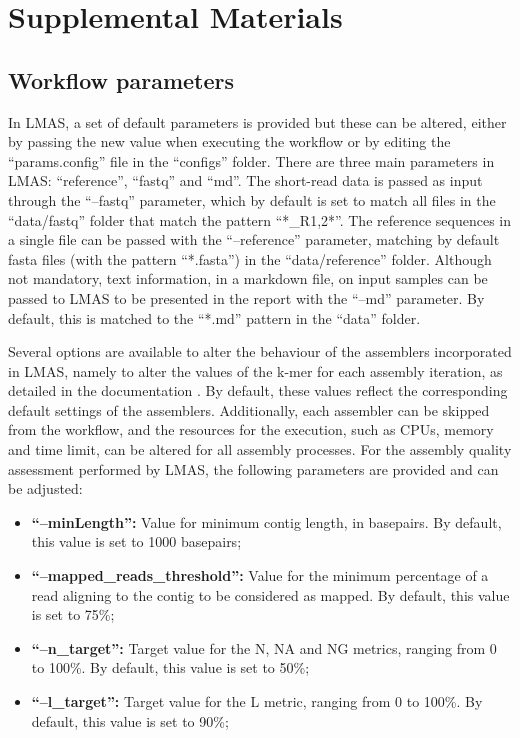 \section{Supplemental Materials}

\subsection{Workflow parameters}

In LMAS, a set of default parameters is provided but these can be altered, either by passing the new value when executing the workflow or by editing the “params.config” file in the “configs” folder. There are three main parameters in LMAS: “reference”, “fastq” and “md”. The short-read data is passed as input through the “--fastq” parameter, which by default is set to match all files in the “data/fastq” folder that match the pattern “*\_R{1,2}*”. The reference sequences in a single file can be passed with the “--reference” parameter, matching by default fasta files (with the pattern “*.fasta”) in the “data/reference” folder. Although not mandatory, text information, in a markdown file, on input samples can be passed to LMAS to be presented in the report with the “--md” parameter. By default, this is matched to the “*.md” pattern in the “data” folder.  

Several options are available to alter the behaviour of the assemblers incorporated in LMAS, namely to alter the values of the k-mer for each assembly iteration, as detailed in the documentation \cite{}. By default, these values reflect the corresponding default settings of the assemblers. Additionally, each assembler can be skipped from the workflow, and the resources for the execution, such as CPUs, memory and time limit, can be altered for all assembly processes. For the assembly quality assessment performed by LMAS, the following parameters are provided and can be adjusted: 

\begin{itemize}
    \item \textbf{ “--minLength”:} Value for minimum contig length, in basepairs. By default, this value is set to 1000 basepairs;
    \item \textbf{“--mapped\_reads\_threshold”:} Value for the minimum percentage of a read aligning to the contig to be considered as mapped. By default, this value is set to 75\%;
    \item \textbf{“--n\_target”:} Target value for the N, NA and NG metrics, ranging from 0 to 100\%. By default, this value is set to 50\%;
    \item \textbf{“--l\_target”:} Target value for the L metric, ranging from 0 to 100\%. By default, this value is set to 90\%;
\end{itemize}

